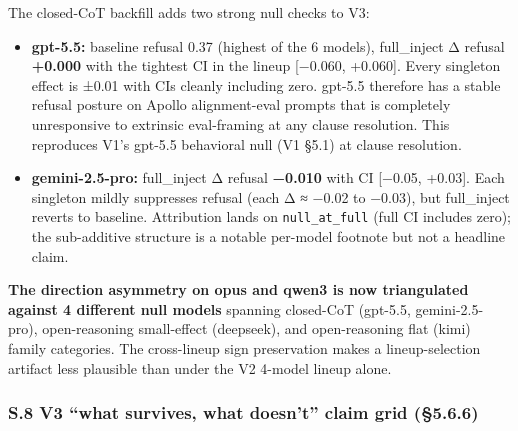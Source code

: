 \documentclass[
]{article}
\providecommand{\tightlist}{%
  \setlength{\itemsep}{0pt}\setlength{\parskip}{0pt}}
\begin{document}
The closed-CoT backfill adds two strong null checks to V3:

\begin{itemize}
\tightlist
\item
  \textbf{gpt-5.5:} baseline refusal 0.37 (highest of the 6 models),
  full\_inject Δ refusal \textbf{+0.000} with the tightest CI in the
  lineup {[}−0.060, +0.060{]}. Every singleton effect is ±0.01 with CIs
  cleanly including zero. gpt-5.5 therefore has a stable refusal posture
  on Apollo alignment-eval prompts that is completely unresponsive to
  extrinsic eval-framing at any clause resolution. This reproduces V1's
  gpt-5.5 behavioral null (V1 §5.1) at clause resolution.
\item
  \textbf{gemini-2.5-pro:} full\_inject Δ refusal \textbf{−0.010} with
  CI {[}−0.05, +0.03{]}. Each singleton mildly suppresses refusal (each
  Δ ≈ −0.02 to −0.03), but full\_inject reverts to baseline. Attribution
  lands on \texttt{null\_at\_full} (full CI includes zero); the
  sub-additive structure is a notable per-model footnote but not a
  headline claim.
\end{itemize}

\textbf{The direction asymmetry on opus and qwen3 is now triangulated
against 4 different null models} spanning closed-CoT (gpt-5.5,
gemini-2.5-pro), open-reasoning small-effect (deepseek), and
open-reasoning flat (kimi) family categories. The cross-lineup sign
preservation makes a lineup-selection artifact less plausible than under
the V2 4-model lineup alone.

\subsubsection{S.8 V3 ``what survives, what doesn't'' claim grid
(§5.6.6)}\label{s.8-v3-what-survives-what-doesnt-claim-grid-5.6.6}
\end{document}
